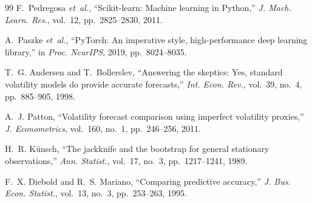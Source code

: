 \begin{thebibliography}{99}
 F.~Pedregosa \emph{et~al.}, ``Scikit-learn:
Machine learning in Python,'' \emph{J. Mach. Learn. Res.}, vol.~12,
pp.~2825--2830, 2011.

 A.~Paszke \emph{et~al.}, ``PyTorch: An imperative
style, high-performance deep learning library,'' in \emph{Proc. NeurIPS},
2019, pp.~8024--8035.

 T.~G. Andersen and T.~Bollerslev, ``Answering the
skeptics: Yes, standard volatility models do provide accurate
forecasts,'' \emph{Int. Econ. Rev.}, vol.~39, no.~4, pp.~885--905, 1998.

 A.~J. Patton, ``Volatility forecast comparison using
imperfect volatility proxies,'' \emph{J. Econometrics}, vol.~160, no.~1,
pp.~246--256, 2011.

 H.~R. K\"unsch, ``The jackknife and the bootstrap
for general stationary observations,'' \emph{Ann. Statist.}, vol.~17,
no.~3, pp.~1217--1241, 1989.

 F.~X. Diebold and R.~S. Mariano, ``Comparing
predictive accuracy,'' \emph{J. Bus. Econ. Statist.}, vol.~13, no.~3,
pp.~253--263, 1995.

\end{thebibliography}